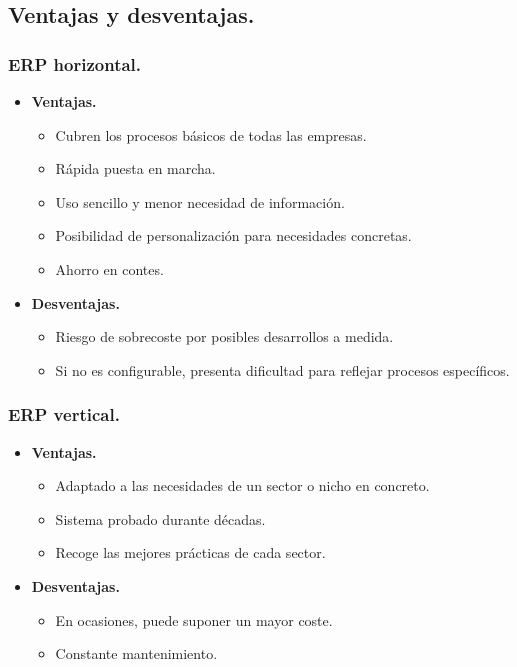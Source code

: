 \documentclass[
]{article}
\providecommand{\tightlist}{%
  \setlength{\itemsep}{0pt}\setlength{\parskip}{0pt}}
\begin{document}
\hypertarget{ventajas-y-desventajas.}{%
\subsection{Ventajas y desventajas.}\label{ventajas-y-desventajas.}}

\hypertarget{erp-horizontal.}{%
\subsubsection{ERP horizontal.}\label{erp-horizontal.}}

\begin{itemize}
\item
  \textbf{Ventajas.}

  \begin{itemize}
  \tightlist
  \item
    Cubren los procesos básicos de todas las empresas.
  \item
    Rápida puesta en marcha.
  \item
    Uso sencillo y menor necesidad de información.
  \item
    Posibilidad de personalización para necesidades concretas.
  \item
    Ahorro en contes.
  \end{itemize}
\item
  \textbf{Desventajas.}

  \begin{itemize}
  \tightlist
  \item
    Riesgo de sobrecoste por posibles desarrollos a medida.
  \item
    Si no es configurable, presenta dificultad para reflejar procesos
    específicos.
  \end{itemize}
\end{itemize}

\hypertarget{erp-vertical.}{%
\subsubsection{ERP vertical.}\label{erp-vertical.}}

\begin{itemize}
\item
  \textbf{Ventajas.}

  \begin{itemize}
  \tightlist
  \item
    Adaptado a las necesidades de un sector o nicho en concreto.
  \item
    Sistema probado durante décadas.
  \item
    Recoge las mejores prácticas de cada sector.
  \end{itemize}
\item
  \textbf{Desventajas.}

  \begin{itemize}
  \tightlist
  \item
    En ocasiones, puede suponer un mayor coste.
  \item
    Constante mantenimiento.
  \end{itemize}
\end{itemize}
\end{document}
